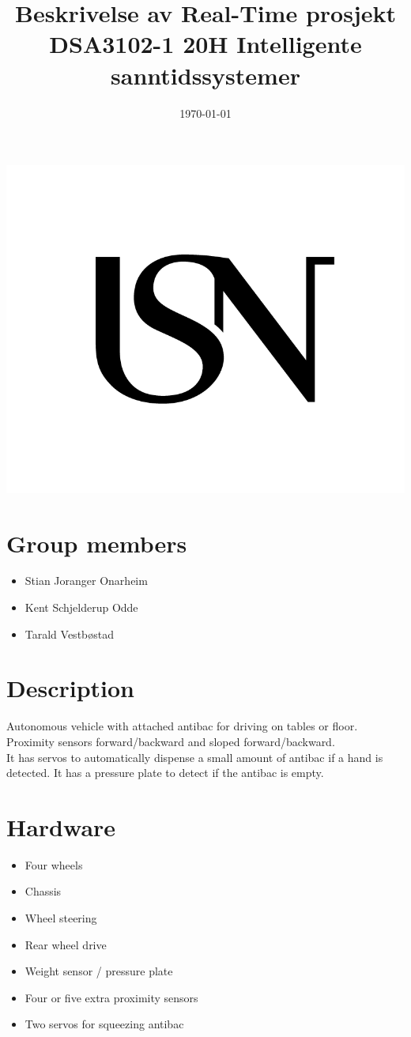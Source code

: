 \documentclass{article}
\title{Beskrivelse av Real-Time prosjekt \large\\
DSA3102-1 20H Intelligente sanntidssystemer}
\date{\today}
\begin{document}
\maketitle
\thispagestyle{empty}
\begin{center}
\includegraphics[width=\linewidth,height=0.2\textheight,keepaspectratio]{img/USN.png}
\end{center}


\newpage
\section{Group members}
	\begin{itemize}
		\item{Stian Joranger Onarheim}
		\item{Kent Schjelderup Odde}
		\item{Tarald Vestbøstad}
	\end{itemize}
\newpage
\section{Description}
	Autonomous vehicle with attached antibac for driving on tables or floor.\\
	Proximity sensors forward/backward and sloped forward/backward.\\
	It has servos to automatically dispense a small amount of antibac if a hand is detected. It has a pressure plate to detect if the antibac is empty.
\newpage
\section{Hardware}
	\begin{itemize}
		\item{Four wheels}
		\item{Chassis}
		\item{Wheel steering}
		\item{Rear wheel drive}
		\item{Weight sensor / pressure plate}
		\item{Four or five extra proximity sensors}
		\item{Two servos for squeezing antibac}
	\end{itemize}
\newpage
\end{document}
